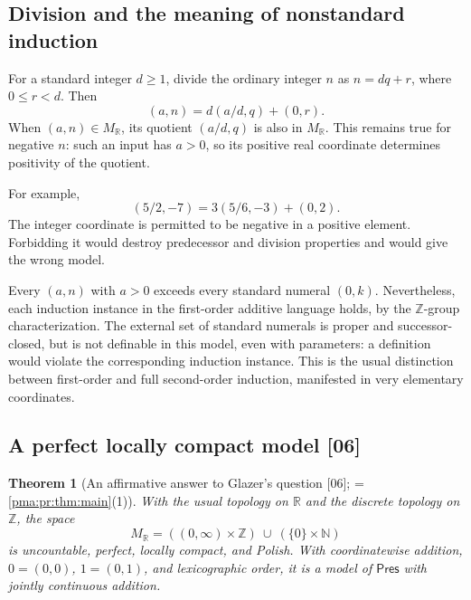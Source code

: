 \documentclass[11pt]{article}
\numberwithin{equation}{section}
\newtheorem{theorem}{Theorem}[section]
\theoremstyle{definition}
\theoremstyle{remark}
\newcommand{\N}{\mathbb N}
\newcommand{\Z}{\mathbb Z}
\newcommand{\R}{\mathbb R}
\newcommand{\src}[1]{\textup{\textsf{\small[#1]}}}
\newcommand{\Pres}{\mathsf{Pres}}
\begin{document}
\subsection{Division and the meaning of nonstandard induction}

For a standard integer $d\geq1$, divide the ordinary integer $n$ as
$n=dq+r$, where $0\leq r<d$. Then
\begin{equation}
\label{pma:cp:eq:divisionreal}
(a,n)=d(a/d,q)+(0,r).
\end{equation}
When $(a,n)\in M_{\R}$, its quotient $(a/d,q)$ is also in $M_{\R}$.
This remains true for negative $n$: such an input has $a>0$, so its
positive real coordinate determines positivity of the quotient.

For example,
\[
(5/2,-7)=3(5/6,-3)+(0,2).
\]
The integer coordinate is permitted to be negative in a positive element.
Forbidding it would destroy predecessor and division properties and would
give the wrong model.

Every $(a,n)$ with $a>0$ exceeds every standard numeral $(0,k)$.
Nevertheless, each induction instance in the first-order additive language
holds, by the $\Z$-group characterization. The external set of standard
numerals is proper and successor-closed, but is not definable in this model,
even with parameters: a definition would violate the corresponding
induction instance. This is the usual distinction between first-order and
full second-order induction, manifested in very elementary coordinates.

\subsection{A perfect locally compact model \src{06}}
\label{pma:cp:s06:sec:real}

\begin{theorem}[An affirmative answer to Glazer's question \src{06}; = \cref{pma:pr:thm:main}(1)]
\label{pma:cp:s06:thm:real}
With the usual topology on $\R$ and the discrete topology on $\Z$, the
space
\begin{equation}
 M_{\R}=((0,\infty)\times\Z)\ \cup\ (\{0\}\times\N)
 \label{pma:cp:s06:eq:realmodel}
\end{equation}
is uncountable, perfect, locally compact, and Polish. With coordinatewise
addition, $0=(0,0)$, $1=(0,1)$, and lexicographic order, it is a model of
$\Pres$ with jointly continuous addition.
\end{theorem}
\end{document}
